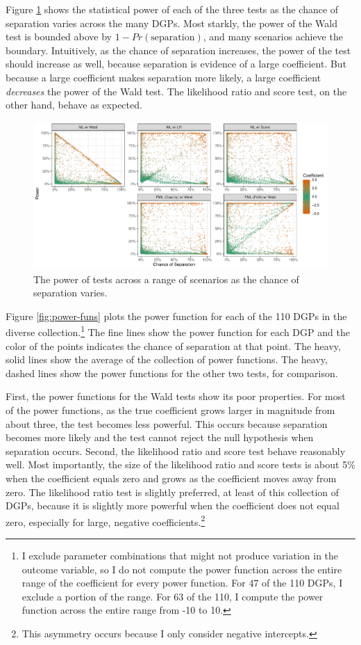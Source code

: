 \documentclass[
]{article}
\begin{document}
Figure \ref{fig:many-sims} shows the statistical power of each of the
three tests as the chance of separation varies across the many DGPs.
Most starkly, the power of the Wald test is bounded above by
\(1 - Pr(\text{separation})\), and many scenarios achieve the boundary.
Intuitively, as the chance of separation increases, the power of the
test should increase as well, because separation is evidence of a large
coefficient. But because a large coefficient makes separation more
likely, a large coefficient \emph{decreases} the power of the Wald test.
The likelihood ratio and score test, on the other hand, behave as
expected.

\begin{figure}[h]
\includegraphics[width=\textwidth]{doc/fig/many-sims.pdf}
\caption{The power of tests across a range of scenarios as the chance of separation varies.}\label{fig:many-sims}
\end{figure}

Figure \ref{fig:power-funs} plots the power function for each of the 110
DGPs in the diverse collection.\footnote{I exclude parameter
  combinations that might not produce variation in the outcome variable,
  so I do not compute the power function across the entire range of the
  coefficient for every power function. For 47 of the 110 DGPs, I
  exclude a portion of the range. For 63 of the 110, I compute the power
  function across the entire range from -10 to 10.} The fine lines show
the power function for each DGP and the color of the points indicates
the chance of separation at that point. The heavy, solid lines show the
average of the collection of power functions. The heavy, dashed lines
show the power functions for the other two tests, for comparison.

First, the power functions for the Wald tests show its poor properties.
For most of the power functions, as the true coefficient grows larger in
magnitude from about three, the test becomes less powerful. This occurs
because separation becomes more likely and the test cannot reject the
null hypothesis when separation occurs. Second, the likelihood ratio and
score test behave reasonably well. Most importantly, the size of the
likelihood ratio and score tests is about 5\% when the coefficient
equals zero and grows as the coefficient moves away from zero. The
likelihood ratio test is slightly preferred, at least of this collection
of DGPs, because it is slightly more powerful when the coefficient does
not equal zero, especially for large, negative coefficients.\footnote{This
  asymmetry occurs because I only consider negative intercepts.}
\end{document}
